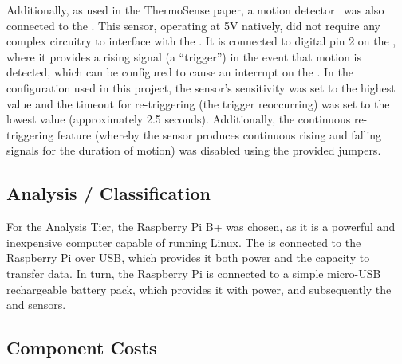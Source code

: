 \documentclass[../thesis/thesis.tex]{subfiles}
\begin{document}
Additionally, as used in the ThermoSense paper, a \pir motion detector~\cite{AdafruitPIR} was also connected to the \ard. This sensor, operating at 5V natively, did not require any complex circuitry to interface with the \ard. It is connected to digital pin 2 on the \ard, where it provides a rising signal (a ``trigger'') in the event that motion is detected, which can be configured to cause an interrupt on the \ard. In the configuration used in this project, the sensor's sensitivity was set to the highest value and the timeout for re-triggering (the trigger reoccurring) was set to the lowest value (approximately 2.5 seconds). Additionally, the continuous re-triggering feature (whereby the sensor produces continuous rising and falling signals for the duration of motion) was disabled using the provided jumpers. 

\subsection{Analysis / Classification}
For the Analysis Tier, the Raspberry Pi B+ was chosen, as it is a powerful and inexpensive computer capable of running Linux. The \ard is connected to the Raspberry Pi over USB, which provides it both power and the capacity to transfer data. In turn, the Raspberry Pi is connected to a simple micro-USB rechargeable battery pack, which provides it with power, and subsequently the \ard and sensors.

\clearpage{}

\subsection{Component Costs}
\label{subsec:cost}
\end{document}
